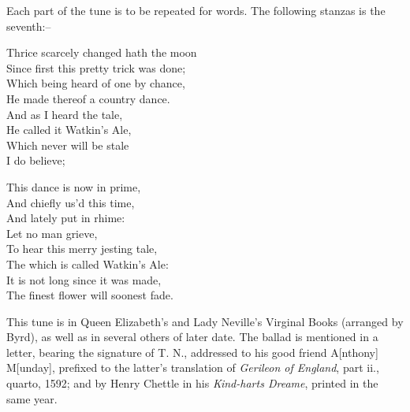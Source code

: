 Each part of the tune is to be repeated for words. The following stanzas
is the seventh:--
\settowidth{\versewidth}{He made thereof a country dance.}
\begin{dcverse}
\begin{patverse}
Thrice scarcely changed hath the moon\\
Since first this pretty trick was done;\\
Which being heard of one by chance,\\
He made thereof a country dance.\\
And as I heard the tale,\\
He called it Watkin’s Ale,\\
Which never will be stale\\
I do believe;
\end{patverse}

\begin{patverse}
\vin\vin This dance is now in prime,\\
And chiefly us’d this time,\\
And lately put in rhime:\\
Let no man grieve,\\
To hear this merry jesting tale,\\
The which is called Watkin’s Ale:\\
It is not long since it was made,\\
The finest flower will soonest fade.
\end{patverse}
\end{dcverse}


This tune is in Queen Elizabeth’s and Lady Neville’s Virginal Books (arranged
by Byrd), as well as in several others of later date. The ballad is mentioned in a
letter, bearing the signature of T. N., addressed to his good friend A[nthony]
M[unday], prefixed to the latter’s translation of \textit{Gerileon of England}, part ii.,
quarto, 1592; and by Henry Chettle in his \textit{Kind-harts Dreame}, printed in the
same year.
\pagebreak
\normalsize

